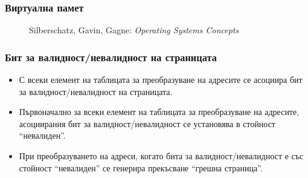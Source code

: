 \documentclass[ignorenonframetext, hyperref=unicode]{beamer}
\begin{document}
\begin{frame}
\frametitle{Виртуална памет}
\begin{figure}[h]
\center
{}
\caption{Silberschatz, Gavin, Gagne: {\em Operating Systems Concepts}}
\end{figure}
\end{frame}

\begin{frame}
\frametitle{Бит за валидност/невалидност на страницата}
\begin{itemize}
  \item С всеки елемент на таблицата за преобразуване на адресите се асоциира
  бит за валидност/невалидност на страницата.
  \item Първоначално за всеки елемент на таблицата за преобразуване на
  адресите, асоциирания бит за валидност/невалидност се установява в стойност
  ``невалиден''.
  \item При преобразуването на адреси, когато бита за валидност/невалидност е
  със стойност ``невалиден'' се генерира прекъсване ``грешна
  страница''.
\end{itemize}
\end{frame}
\end{document}
